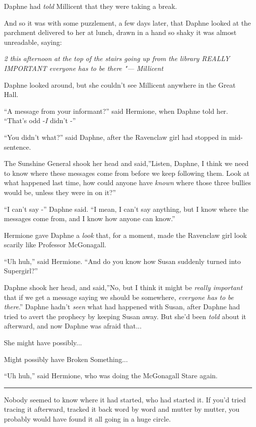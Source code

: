 Daphne had \emph{told} Millicent that they were taking a break.

And so it was with some puzzlement, a few days later, that Daphne looked
at the parchment delivered to her at lunch, drawn in a hand so shaky it
was almost unreadable, saying:

\emph{2 this afternoon at the top of the stairs going up from the
library REALLY IMPORTANT everyone has to be there "--- Millicent}

Daphne looked around, but she couldn't see Millicent anywhere in the
Great Hall.

``A message from your informant?'' said Hermione, when Daphne told her.
``That's odd -\emph{I} didn't -''

``You didn't what?'' said Daphne, after the Ravenclaw girl had stopped
in mid-sentence.

The Sunshine General shook her head and said,''Listen, Daphne, I think
we need to know where these messages come from before we keep following
them. Look at what happened last time, how could anyone have
\emph{known} where those three bullies would be, unless they were in on
it?''

``I can't say -'' Daphne said. ``I mean, I can't say anything, but I
know where the messages come from, and I know how anyone can know.''

Hermione gave Daphne a \emph{look} that, for a moment, made the
Ravenclaw girl look scarily like Professor McGonagall.

``Uh huh,'' said Hermione. ``And do you know how Susan suddenly turned
into Supergirl?''

Daphne shook her head, and said,''No, but I think it might be
\emph{really important} that if we get a message saying we should be
somewhere, \emph{everyone has to be there}.'' Daphne hadn't \emph{seen}
what had happened with Susan, after Daphne had tried to avert the
prophecy by keeping Susan away. But she'd been \emph{told} about it
afterward, and now Daphne was afraid that...

She might have possibly...

Might possibly have Broken Something...

``Uh huh,'' said Hermione, who was doing the McGonagall Stare again.

\begin{center}\rule{3in}{0.4pt}\end{center}

Nobody seemed to know where it had started, who had started it. If you'd
tried tracing it afterward, tracked it back word by word and mutter by
mutter, you probably would have found it all going in a huge circle.

